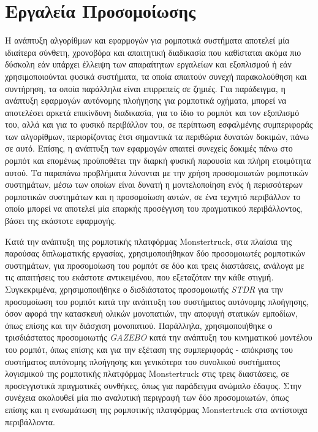 \section{Εργαλεία Προσομοίωσης}
Η ανάπτυξη αλγορίθμων και εφαρμογών για ρομποτικά συστήματα αποτελεί μία ιδιαίτερα σύνθετη, χρονοβόρα και απαιτητική διαδικασία που καθίσταται ακόμα πιο δύσκολη εάν υπάρχει έλλειψη των απαραίτητων εργαλείων και εξοπλισμού ή εάν χρησιμοποιούνται φυσικά συστήματα, τα οποία απαιτούν συνεχή παρακολούθηση και συντήρηση, τα οποία παράλληλα είναι επιρρεπείς σε ζημιές. Για παράδειγμα, η ανάπτυξη εφαρμογών αυτόνομης πλοήγησης για ρομποτικά οχήματα, μπορεί να αποτελέσει αρκετά επικίνδυνη διαδικασία, για το ίδιο το ρομπότ και τον εξοπλισμό του, αλλά και για το φυσικό περιβάλλον του, σε περίπτωση εσφαλμένης συμπεριφοράς των αλγορίθμων, περιορίζοντας έτσι σημαντικά τα περιθώρια δυνατών δοκιμών, πάνω σε αυτό. Επίσης, η ανάπτυξη των εφαρμογών απαιτεί συνεχείς δοκιμές πάνω στο ρομπότ και επομένως προϋποθέτει την διαρκή φυσική παρουσία και πλήρη ετοιμότητα αυτού. Τα παραπάνω προβλήματα λύνονται με την χρήση προσομοιωτών ρομποτικών συστημάτων, μέσω των οποίων είναι δυνατή η μοντελοποίηση ενός ή περισσότερων ρομποτικών συστημάτων και η προσομοίωση αυτών, σε ένα τεχνητό περιβάλλον το οποίο μπορεί να αποτελεί μία επαρκής προσέγγιση του πραγματικού περιβάλλοντος, βάσει της εκάστοτε εφαρμογής.

\bigskip
Κατά την ανάπτυξη της ρομποτικής πλατφόρμας Monstertruck, στα πλαίσια της παρούσας διπλωματικής εργασίας, χρησιμοποιήθηκαν δύο προσομοιωτές ρομποτικών συστημάτων, για προσομοίωση του ρομπότ σε δύο και τρεις διαστάσεις, ανάλογα με τις απαιτήσεις του εκάστοτε αντικειμένου, που εξεταζόταν την κάθε στιγμή. Συγκεκριμένα, χρησιμοποιήθηκε ο δισδιάστατος προσομοιωτής \textit{STDR} \cite{stdr} για την προσομοίωση του ρομπότ κατά την ανάπτυξη του συστήματος αυτόνομης πλοήγησης, όσον αφορά την κατασκευή ολικών μονοπατιών, την αποφυγή στατικών εμποδίων, όπως επίσης και την διάσχιση μονοπατιού. Παράλληλα, χρησιμοποιήθηκε ο τρισδιάστατος προσομοιωτής \textit{GAZEBO} \cite{gazebo} κατά την ανάπτυξη του κινηματικού μοντέλου του ρομπότ, όπως επίσης και για την εξέταση της συμπεριφοράς - απόκρισης του συστήματος αυτόνομης πλοήγησης και γενικότερα του συνολικού συστήματος λογισμικού της ρομποτικής πλατφόρμας Monstertruck στις τρεις διαστάσεις, σε προσεγγιστικά πραγματικές συνθήκες, όπως για παράδειγμα ανώμαλο έδαφος. Στην συνέχεια ακολουθεί μία πιο αναλυτική περιγραφή των δύο προσομοιωτών, όπως επίσης και η ενσωμάτωση της ρομποτικής πλατφόρμας Monstertruck στα αντίστοιχα περιβάλλοντα.

